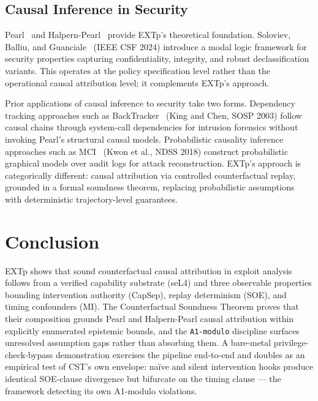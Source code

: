 \documentclass[conference]{IEEEtran}
\begin{document}
\subsection{Causal Inference in Security}

Pearl~\cite{pearl2009causality} and
Halpern-Pearl~\cite{halpern2005causes} provide EXTp's theoretical
foundation. Soloviev, Balliu, and
Guanciale~\cite{soloviev2024modal} (IEEE CSF 2024) introduce a
modal logic framework for security properties capturing
confidentiality, integrity, and robust declassification variants.
This operates at the policy specification level rather than the
operational causal attribution level; it complements EXTp's
approach.

Prior applications of causal inference to security take two forms.
Dependency tracking approaches such as
BackTracker~\cite{king2003backtracking} (King and Chen, SOSP 2003)
follow causal chains through system-call dependencies for intrusion
forensics without invoking Pearl's structural causal models.
Probabilistic causality inference approaches such as
MCI~\cite{kwon2018mci} (Kwon et al., NDSS 2018) construct
probabilistic graphical models over audit logs for attack
reconstruction. EXTp's approach is categorically different: causal
attribution via controlled counterfactual replay, grounded in a
formal soundness theorem, replacing probabilistic assumptions with
deterministic trajectory-level guarantees.

\section{Conclusion}\label{sec:conclusion}

EXTp shows that sound counterfactual causal attribution in exploit
analysis follows from a verified capability substrate (seL4) and
three observable properties bounding intervention authority
(CapSep), replay determinism (SOE), and timing confounders (MI).
The Counterfactual Soundness Theorem proves that their composition
grounds Pearl and Halpern-Pearl causal
attribution within explicitly enumerated epistemic bounds, and the
\texttt{A1-modulo} discipline surfaces unresolved assumption gaps
rather than absorbing them. A bare-metal privilege-check-bypass
demonstration exercises the pipeline end-to-end and doubles as an
empirical test of CST's own envelope: naïve and silent
intervention hooks produce identical SOE-clause divergence but
bifurcate on the timing clause --- the framework detecting its own
A1-modulo violations.
\end{document}
